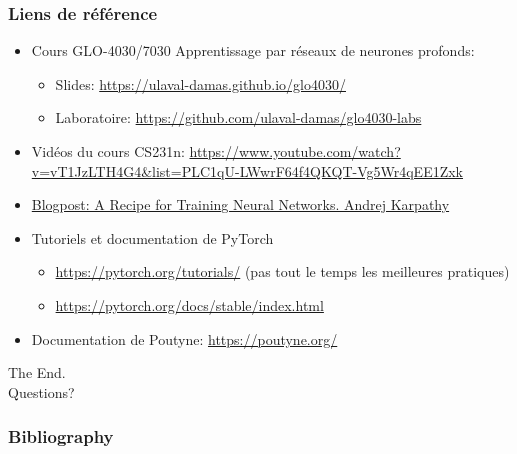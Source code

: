 \documentclass[english,usenames,dvipsnames]{beamer}
\begin{document}
\begin{frame}
	\frametitle{Liens de référence}
	\begin{itemize}
		\item Cours GLO-4030/7030 Apprentissage par réseaux de neurones profonds:
		\begin{itemize}
			\item Slides: \url{https://ulaval-damas.github.io/glo4030/}
			\item Laboratoire: \url{https://github.com/ulaval-damas/glo4030-labs}
		\end{itemize}
		\item Vidéos du cours CS231n: \url{https://www.youtube.com/watch?v=vT1JzLTH4G4&list=PLC1qU-LWwrF64f4QKQT-Vg5Wr4qEE1Zxk}
        \item \href{https://karpathy.github.io/2019/04/25/recipe/}{Blogpost: A Recipe for Training Neural Networks. Andrej Karpathy}
		\item Tutoriels et documentation de PyTorch
		\begin{itemize}
			\item \url{https://pytorch.org/tutorials/} (pas tout le temps les meilleures pratiques)
			\item \url{https://pytorch.org/docs/stable/index.html}
		\end{itemize}
		\item Documentation de Poutyne: \url{https://poutyne.org/}
	\end{itemize}

\end{frame}

\begin{frame}[nonum]
	\begin{center}
		{\Huge The End.\\[2cm] Questions?}
	\end{center}
\end{frame}

\begin{frame}
	\frametitle{Bibliography}
    \printbibliography
\end{frame}

\appendix
\end{document}
